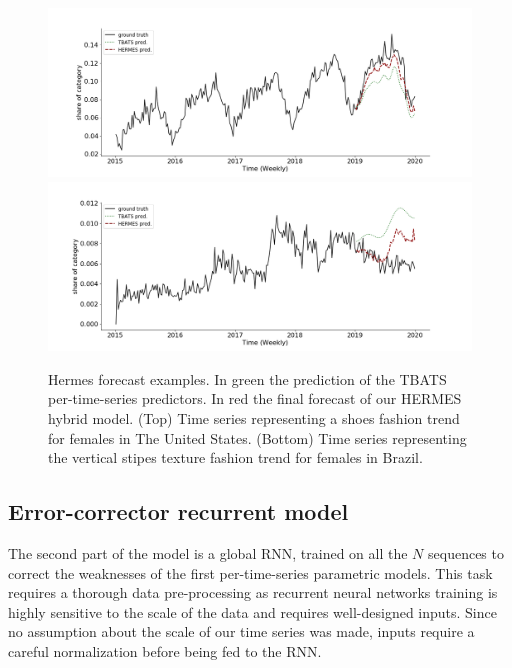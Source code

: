 \documentclass[review]{elsarticle}
\begin{document}
\begin{figure}
\centering
  \includegraphics[width=\linewidth]{figure/us_female_shoes}
  \includegraphics[width=\linewidth]{figure/br_female_texture_verticalstripe}
\caption{Hermes forecast examples. In green the prediction of the TBATS per-time-series predictors. In red the final forecast of our HERMES hybrid model. (Top) Time series representing a shoes fashion trend for females in The United States. (Bottom) Time series representing the vertical stipes texture fashion trend for females in Brazil.}
\label{fig:introexamples}
\end{figure}

\subsection{Error-corrector recurrent model}

The second part of the model is a global RNN, trained on all the $N$ sequences to correct the weaknesses of the first per-time-series parametric models. This task requires a thorough data pre-processing as recurrent neural networks training is highly sensitive to the scale of the data and requires well-designed inputs. Since no assumption about the scale of our time series was made, inputs require a careful normalization before being fed to the RNN.
\end{document}
